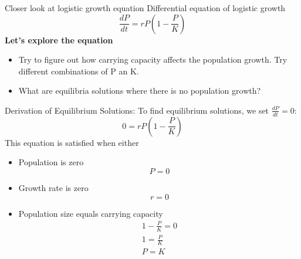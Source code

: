 \begin{frame}{Closer look at logistic growth equation }
Differential equation of logistic growth
\begin{equation*}
       \frac{dP}{dt} = rP\left(1 - \frac{P}{K}\right)
\end{equation*}
\vfill
\textbf{Let’s explore the equation}
\begin{itemize}
    \item Try to figure out how  carrying capacity affects the population growth. Try different combinations of P an K. 
    \pause
    \item What are equilibria solutions where there is no population growth? 
\end{itemize}
\end{frame}

\begin{frame}{Derivation of Equilibrium Solutions:}
\small
To find equilibrium solutions, we set $\frac{dP}{dt} = 0$:
\begin{equation*}
   0 = rP \left(1 - \frac{P}{K}\right) 
\end{equation*}
    \pause
This equation is satisfied when either
\begin{itemize}
    \item  Population is zero \begin{equation*}
   P = 0
\end{equation*}
    \pause
\item Growth rate is  zero 
\begin{equation*}
   r = 0
\end{equation*}
    \pause
\item Population size equals carrying capacity 
\begin{equation*}
 \begin{aligned}
   1 - \frac{P}{K} = 0 \\
    1 = \frac{P}{K} \\
    P = K
\end{aligned}
\end{equation*}
\end{itemize}

\end{frame}

